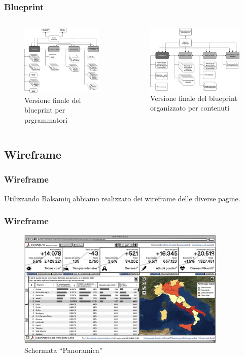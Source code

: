 \documentclass[handout]{beamer}
\begin{document}
		\begin{frame}
			\frametitle{Blueprint}
			\begin{columns}[t]
					\begin{column}[T]{5cm}
						\begin{figure}
							\includegraphics[width=5cm]{img/blueprint-prog-4}
							\caption{Versione finale del blueprint per prgrammatori}
						\end{figure}
					\end{column}
					\begin{column}[T]{5cm}
						\begin{figure}
							\includegraphics[width=5cm]{img/blueprint-cont-4}
							\caption{Versione finale del blueprint organizzato per contenuti}
						\end{figure}
					\end{column}
			\end{columns}
		\end{frame}


		\subsection{Wireframe}
		\begin{frame}
			\frametitle{Wireframe}
			Utilizzando Balsamiq abbiamo realizzato dei wireframe delle diverse pagine. 
		\end{frame}

		\begin{frame}
			\frametitle{Wireframe}
			\begin{figure}
				\includegraphics[width=10cm]{img/panoramica}
				\caption{Schermata ``Panoramica''}
			\end{figure}
		\end{frame}
\end{document}
